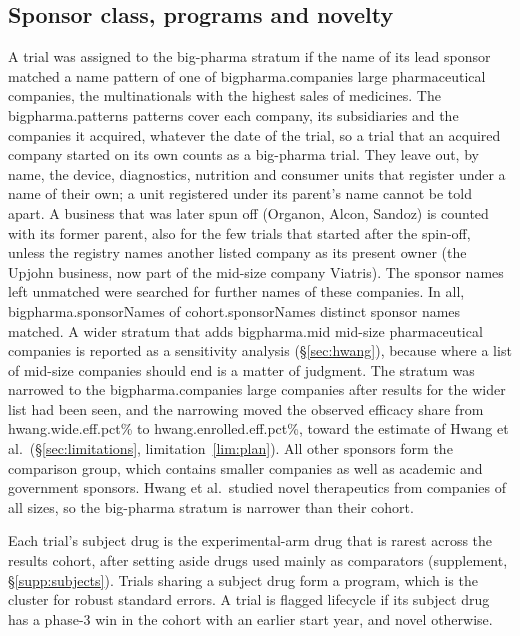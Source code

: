 \documentclass[11pt]{article}
\begin{document}
\subsection{Sponsor class, programs and novelty}\label{sec:strata}
A trial was assigned to the big-pharma stratum if the name of its lead sponsor matched a name pattern of one of \num{bigpharma.companies} large pharmaceutical companies, the multinationals with the highest sales of medicines. The \num{bigpharma.patterns} patterns cover each company, its subsidiaries and the companies it acquired, whatever the date of the trial, so a trial that an acquired company started on its own counts as a big-pharma trial. They leave out, by name, the device, diagnostics, nutrition and consumer units that register under a name of their own; a unit registered under its parent's name cannot be told apart. A business that was later spun off (Organon, Alcon, Sandoz) is counted with its former parent, also for the few trials that started after the spin-off, unless the registry names another listed company as its present owner (the Upjohn business, now part of the mid-size company Viatris). The sponsor names left unmatched were searched for further names of these companies. In all, \num{bigpharma.sponsorNames} of \num{cohort.sponsorNames} distinct sponsor names matched. A wider stratum that adds \num{bigpharma.mid} mid-size pharmaceutical companies is reported as a sensitivity analysis (\S\ref{sec:hwang}), because where a list of mid-size companies should end is a matter of judgment. The stratum was narrowed to the \num{bigpharma.companies} large companies after results for the wider list had been seen, and the narrowing moved the observed efficacy share from \num{hwang.wide.eff.pct}\% to \num{hwang.enrolled.eff.pct}\%, toward the estimate of Hwang et al.\ (\S\ref{sec:limitations}, limitation~\ref{lim:plan}). All other sponsors form the comparison group, which contains smaller companies as well as academic and government sponsors. Hwang et al.\ studied novel therapeutics from companies of all sizes, so the big-pharma stratum is narrower than their cohort.

Each trial's subject drug is the experimental-arm drug that is rarest across the results cohort, after setting aside drugs used mainly as comparators (supplement, \S\ref{supp:subjects}). Trials sharing a subject drug form a program, which is the cluster for robust standard errors. A trial is flagged lifecycle if its subject drug has a phase-3 win in the cohort with an earlier start year, and novel otherwise.
\end{document}
